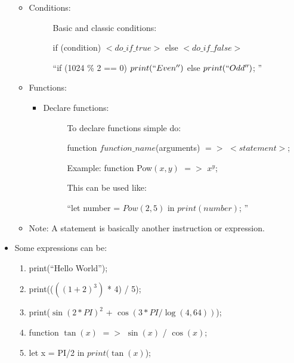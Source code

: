 \begin{itemize}
\begin{itemize}
\begin{description}
                    \end{description}
                \item Conditions:
                    \begin{description}
                        \item[] Basic and classic conditions:
                        \item[] if (condition) $<do\_if\_true>$ else $<do\_if\_false>$
                        \item[] ``if (1024 \% 2 == 0) $print(``Even'')$ else $print(``Odd'')$; ''
                    \end{description}
                \item Functions:
                    \begin{itemize}
                        \item Declare functions:
                        \begin{description}
                            \item[] To declare functions simple do:
                            \item[] function $function\_name${(arguments)} $=>$ $<statement>$;
                            \item[] Example: function Pow$(x,y)$ $=>$ $x^y$;
                            \item[] This can be used like:
                            \item[] ``let number = $Pow(2,5)$ in $print(number)$; ''
                        \end{description}
                    \end{itemize}
                \item Note: A statement is basically another instruction or expression.
            \end{itemize}
        \newpage
        \item Some expressions can be:
            \begin{enumerate}
                \item print{(``Hello World'')};
                \item print{(($({(1 + 2)} ^ 3)$ * 4) / 5)};
                \item print{($\sin{(2 * PI)}^2$ + $\cos(3 * PI / \log(4, 64))$)};
                \item function $\tan{{(x)}}$ $=>$ $\sin{{(x)}}$ / $\cos{{(x)}}$;
                \item let x = PI/2 in $print(\tan{(x)}$);

\end{enumerate}
\end{itemize}
